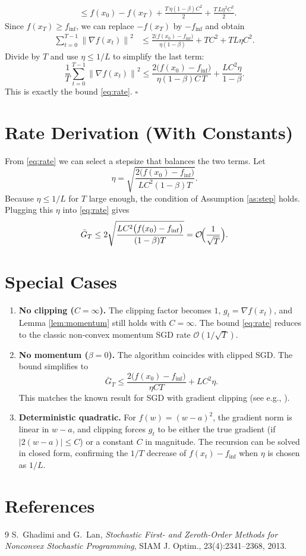 \documentclass{article}
\newcommand{\norm}[1]{\left\lVert #1 \right\rVert}
\begin{document}
\begin{enumerate}
\begin{align}
        &\le f(x_0)-f(x_T) 
            + \frac{T\,\eta(1-\beta)C^2}{2}
            + \frac{T\,L\eta^2 C^2}{2} .
        \label{eq:sum}
    \end{align}
    Since $f(x_T)\ge f_{\inf}$, we can replace $-f(x_T)$ by $-f_{\inf}$ and obtain
    \begin{align}
        \sum_{t=0}^{T-1}\norm{\nabla f(x_t)}^2
        &\le \frac{2\bigl(f(x_0)-f_{\inf}\bigr)}{\eta(1-\beta)}
            + T C^2
            + T L\eta C^2 .
        \label{eq:bound}
    \end{align}
    Divide by $T$ and use $\eta\le 1/L$ to simplify the last term:
    \[
        \frac{1}{T}\sum_{t=0}^{T-1}\norm{\nabla f(x_t)}^2
        \le \frac{2\bigl(f(x_0)-f_{\inf}\bigr)}{\eta(1-\beta)C\,T}
           + \frac{L C^2\eta}{1-\beta}.
    \]
    This is exactly the bound \eqref{eq:rate}. \hfill $\square$
\end{enumerate}

\section*{Rate Derivation (With Constants)}
From \eqref{eq:rate} we can select a stepsize that balances the two terms.
Let
\[
    \eta = \sqrt{\frac{2\bigl(f(x_0)-f_{\inf}\bigr)}{L C^2 (1-\beta) T}} .
\]
Because $\eta\le 1/L$ for $T$ large enough, the condition of Assumption \ref{as:step} holds.
Plugging this $\eta$ into \eqref{eq:rate} gives
\[
    \bar{G}_T \le 2\sqrt{\frac{L C^2\bigl(f(x_0)-f_{\inf}\bigr)}{(1-\beta)T}}
    = \mathcal{O}\!\Bigl(\frac{1}{\sqrt{T}}\Bigr).
\]

\section*{Special Cases}
\begin{enumerate}[label=\alph*.]
    \item \textbf{No clipping ($C=\infty$).}  
    The clipping factor becomes $1$, $g_t=\nabla f(x_t)$, and Lemma \ref{lem:momentum} still holds with $C=\infty$.  The bound \eqref{eq:rate} reduces to the classic non‑convex momentum SGD rate $\mathcal{O}(1/\sqrt{T})$.
    \item \textbf{No momentum ($\beta=0$).}  
    The algorithm coincides with clipped SGD.  The bound simplifies to
    \[
        \bar{G}_T \le \frac{2\bigl(f(x_0)-f_{\inf}\bigr)}{\eta C T}
            + L C^2\eta .
    \]
    This matches the known result for SGD with gradient clipping (see e.g., \cite{Ghadimi2013}).
    \item \textbf{Deterministic quadratic.}  
    For $f(w)=(w-a)^2$, the gradient norm is linear in $w-a$, and clipping forces $g_t$ to be either the true gradient (if $|2(w-a)|\le C$) or a constant $C$ in magnitude.  The recursion can be solved in closed form, confirming the $1/T$ decrease of $f(x_t)-f_{\inf}$ when $\eta$ is chosen as $1/L$.
\end{enumerate}

\section*{References}
\begin{thebibliography}{9}
S.~Ghadimi and G.~Lan, \emph{Stochastic First- and Zeroth-Order Methods for Nonconvex Stochastic Programming}, SIAM J. Optim., 23(4):2341–2368, 2013.
\end{thebibliography}
\end{document}
